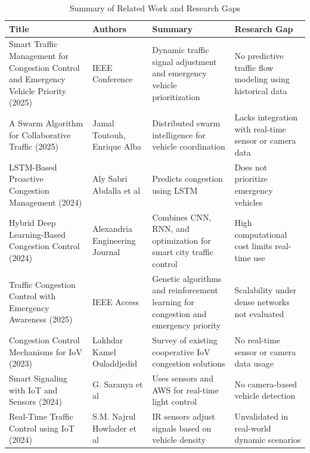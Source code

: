 \documentclass[12pt]{report}
\begin{document}
\begin{table}[h!]
\begin{adjustbox}{width=\linewidth,left}
\begin{tabular}{|p{4cm}|p{3.5cm}|p{5.5cm}|p{4.5cm}|}
\hline
\textbf{Title} & \textbf{Authors} & \textbf{Summary} & \textbf{Research Gap} \\
\hline
Smart Traffic Management for Congestion Control and Emergency Vehicle Priority (2025) & IEEE Conference & Dynamic traffic signal adjustment and emergency vehicle prioritization & No predictive traffic flow modeling using historical data \\
\hline
A Swarm Algorithm for Collaborative Traffic (2025) & Jamal Toutouh, Enrique Alba & Distributed swarm intelligence for vehicle coordination & Lacks integration with real-time sensor or camera data \\
\hline
LSTM-Based Proactive Congestion Management (2024) & Aly Sabri Abdalla et al & Predicts congestion using LSTM & Does not prioritize emergency vehicles \\
\hline
Hybrid Deep Learning-Based Congestion Control (2024) & Alexandria Engineering Journal & Combines CNN, RNN, and optimization for smart city traffic control & High computational cost limits real-time use \\
\hline
Traffic Congestion Control with Emergency Awareness (2025) & IEEE Access & Genetic algorithms and reinforcement learning for congestion and emergency priority & Scalability under dense networks not evaluated \\
\hline
Congestion Control Mechanisms for IoV (2023) & Lakhdar Kamel Ouladdjedid & Survey of existing cooperative IoV congestion solutions & No real-time sensor or camera data usage \\
\hline
Smart Signaling with IoT and Sensors (2024) & G. Saranya et al & Uses sensors and AWS for real-time light control & No camera-based vehicle detection \\
\hline
Real-Time Traffic Control using IoT (2024) & S.M. Najrul Howlader et al & IR sensors adjust signals based on vehicle density & Unvalidated in real-world dynamic scenarios \\
\hline
\end{tabular}
\end{adjustbox}
\vspace{0.5em} %
\caption{Summary of Related Work and Research Gaps}
\label{tab:literature}
\end{table}
\end{document}
